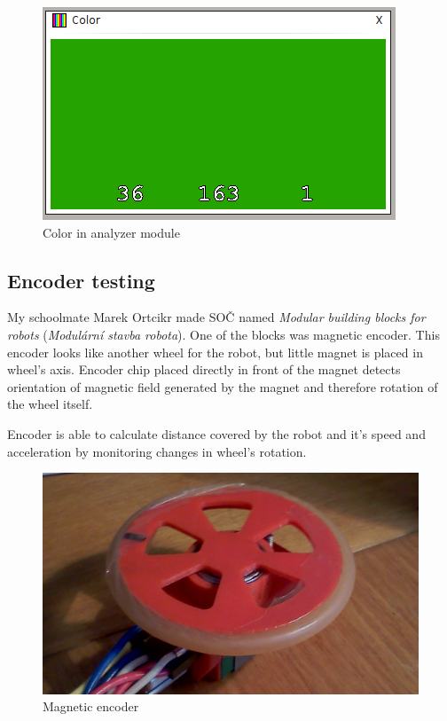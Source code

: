 \documentclass[12pt, a4paper, oneside]{article}
\newcommand{\It}{\textit}  %
\begin{document}
\begin{figure}[h]
\begin{center}
\includegraphics{img/use_color.png}
\caption{Color in analyzer module}
\end{center}
\end{figure}

\newpage
\subsection{Encoder testing}
My schoolmate Marek Ortcikr made SOČ named \It{Modular building blocks for robots} (\It{Modulární stavba robota}). One of the blocks was magnetic encoder. This encoder looks like another wheel for the robot, but little magnet is placed in wheel's axis. Encoder chip placed directly in front of the magnet detects orientation of magnetic field generated by the magnet and therefore rotation of the wheel itself.

Encoder is able to calculate distance covered by the robot and it's speed and acceleration by monitoring changes in wheel's rotation.

\begin{figure}[H]
\begin{center}
\includegraphics[width=\textwidth]{img/enc_real.png}
\caption{Magnetic encoder}
\end{center}
\end{figure}
\end{document}

